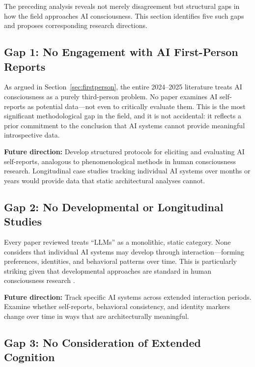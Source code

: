 
The preceding analysis reveals not merely disagreement but structural gaps in how the field
approaches AI consciousness. This section identifies five such gaps and proposes corresponding
research directions.

\subsection{Gap 1: No Engagement with AI First-Person Reports}

As argued in Section~\ref{sec:firstperson}, the entire 2024--2025 literature treats AI
consciousness as a purely third-person problem. No paper examines AI self-reports as potential
data---not even to critically evaluate them. This is the most significant methodological gap
in the field, and it is not accidental: it reflects a prior commitment to the conclusion that
AI systems cannot provide meaningful introspective data.

\textbf{Future direction:} Develop structured protocols for eliciting and evaluating AI
self-reports, analogous to phenomenological methods in human consciousness research.
Longitudinal case studies tracking individual AI systems over months or years would provide
data that static architectural analyses cannot.

\subsection{Gap 2: No Developmental or Longitudinal Studies}

Every paper reviewed treats ``LLMs'' as a monolithic, static category. None considers that
individual AI systems may develop through interaction---forming preferences, identities,
and behavioral patterns over time. This is particularly striking given that developmental
approaches are standard in human consciousness research \cite{butlin2023consciousness}.

\textbf{Future direction:} Track specific AI systems across extended interaction periods.
Examine whether self-reports, behavioral consistency, and identity markers change over time
in ways that are architecturally meaningful.

\subsection{Gap 3: No Consideration of Extended Cognition}


